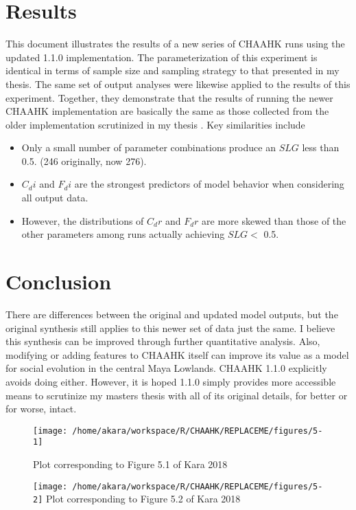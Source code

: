 \documentclass{article}
\begin{document}
\section{Results}
This document illustrates the results of a new series of CHAAHK runs using the updated 1.1.0 implementation. The parameterization of this experiment is identical in terms of sample size and sampling strategy to that presented in my thesis. The same set of output analyses were likewise applied to the results of this experiment. Together, they demonstrate that the results of running the newer CHAAHK implementation are basically the same as those collected from the older implementation scrutinized in my thesis \cite{kara2018b}. Key similarities include 

\begin{itemize}
	\item Only a small number of parameter combinations produce an $ SLG $ less than 0.5. (246 originally, now 276).
	\item $ C_{d}i $ and $ F_{d}i $ are the strongest predictors of model behavior when considering all output data.
	\item However, the distributions of $ C_{d}r $ and $ F_{d}r $ are more skewed than those of the other parameters among runs actually achieving $ SLG  <$  0.5.
\end{itemize}

\section{Conclusion}
There are differences between the original and updated model outputs, but the original synthesis still applies to this newer set of data just the same. I believe this synthesis can be improved through further quantitative analysis. Also, modifying or adding features to CHAAHK itself can improve its value as a model for social evolution in the central Maya Lowlands. CHAAHK 1.1.0 explicitly avoids doing either. However, it is hoped 1.1.0 simply provides more accessible means to scrutinize my masters thesis with all of its original details, for better or for worse, intact.

\begin{figure}[H]
	\texttt{[image: /home/akara/workspace/R/CHAAHK/REPLACEME/figures/5-1]}
	
	Plot corresponding to Figure 5.1 of Kara 2018
	\label{fig:5-1}
\end{figure}

\begin{figure}[H]
	\texttt{[image: /home/akara/workspace/R/CHAAHK/REPLACEME/figures/5-2]}
	Plot corresponding to Figure 5.2 of Kara 2018
	\label{fig:5-2}
\end{figure}
\end{document}

